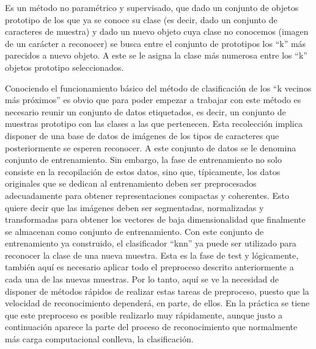 Es un método no paramétrico y supervisado, que dado un conjunto de objetos prototipo de los que ya se conoce su clase (es decir, dado un conjunto de caracteres de muestra) y dado un  nuevo objeto cuya clase no conocemos (imagen de un carácter a reconocer) se busca entre el conjunto de prototipos los “k” más parecidos a nuevo objeto. A este se le asigna la clase más numerosa entre los “k” objetos prototipo seleccionados.  




Conociendo el funcionamiento básico del método de clasificación de los “k vecinos más próximos” es obvio que para poder empezar a trabajar con este método es necesario reunir un conjunto de datos etiquetados, es decir, un conjunto de muestras prototipo con las clases a las que pertenecen. Esta recolección implica disponer de una base de datos de imágenes de los tipos de caracteres que posteriormente se esperen reconocer. A este conjunto de datos se le denomina conjunto de entrenamiento. Sin embargo, la fase de entrenamiento no solo consiste en la recopilación de estos datos, sino que, típicamente, los datos originales que se dedican al 
entrenamiento deben ser preprocesados adecuadamente para obtener representaciones compactas y coherentes. Esto quiere decir que  las  imágenes deben ser segmentadas, normalizadas y transformadas para obtener los vectores de baja dimensionalidad que finalmente se almacenan como conjunto de entrenamiento.
Con este conjunto de entrenamiento ya construido, el clasificador “knn” ya puede ser utilizado para reconocer la clase de una nueva muestra. Esta es la fase de test y lógicamente, también aquí es necesario aplicar todo el preproceso descrito anteriormente a cada una de las nuevas muestras. Por lo tanto, aquí se ve la necesidad de disponer de métodos rápidos de realizar estas tareas de preproceso, puesto que la velocidad de reconocimiento dependerá, en parte, de ellos. En la práctica se tiene que este preproceso es posible realizarlo muy rápidamente, aunque justo a continuación aparece la parte del proceso de reconocimiento que normalmente más carga computacional conlleva, la clasificación. 




